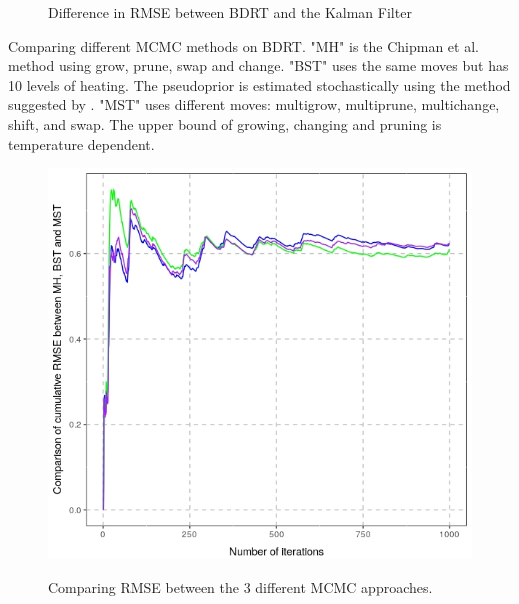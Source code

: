 \documentclass[a1paper,portrait, fontscale=0.45]{baposter}
\begin{document}
\begin{poster}
{\begin{multicols}{3}
\begin{figure}[H]
\begin{minipage}[c]{0.6\linewidth}
\label{fig:kbdiff}
\vspace{-1.7em}
\caption{Difference in RMSE between BDRT and the Kalman Filter}
\end{minipage}
\end{figure}
\end{multicols}
Comparing different MCMC methods on BDRT. \small{"MH" is the Chipman et al. method using grow, prune, swap and change. "BST" uses the same moves but has 10 levels of heating. The pseudoprior is estimated stochastically using the method suggested by \cite{geyer}. "MST" uses different moves: multigrow, multiprune, multichange, shift, and swap. The upper bound of growing, changing and pruning is temperature dependent.}
\begin{multicols}{3}
\begin{figure}[H]
\hspace{1em}
\begin{minipage}[c]{0.6\linewidth}
\includegraphics[width=\linewidth]{comp3rmse.jpeg}
\label{fig:comprmse}
\vspace{-1.7em}
\caption{Comparing RMSE between the 3 different MCMC approaches.}
\end{minipage}
\end{figure}
\begin{figure}[H]
\hspace{1em}
\begin{minipage}[c]{0.6\linewidth}

\end{minipage}
\end{figure}
\end{multicols}}
\end{poster}
\end{document}
